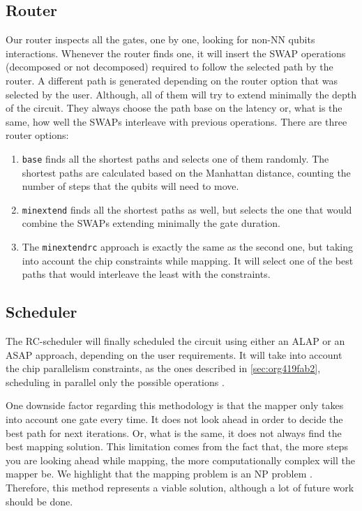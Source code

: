 \subsection{Router}
\label{sec:org38f8894}

Our router inspects all the gates, one by one, looking for non-NN qubits interactions.
Whenever the router finds one, it will insert the SWAP operations (decomposed or not decomposed) required to follow the selected path by the router.
A different path is generated depending on the router option that was selected by the user.
Although, all of them will try to extend minimally the depth of the circuit.
They always choose the path base on the latency or, what is the same, how well the SWAPs interleave with previous operations.
There are three router options:

\begin{enumerate}
\item \texttt{base} finds all the shortest paths and selects one of them randomly. The shortest paths are calculated based on the Manhattan distance, counting the number of steps that the qubits will need to move.
\item \texttt{minextend} finds all the shortest paths as well, but selects the one that would combine the SWAPs extending minimally the gate duration.
\item The \texttt{minextendrc} approach is exactly the same as the second one, but taking into account the chip constraints while mapping. It will select one of the best paths that would interleave the least with the constraints.
\end{enumerate}


\subsection{Scheduler}
\label{sec:org8f6cff7}

The RC-scheduler will finally scheduled the circuit using either an ALAP or an ASAP approach, depending on the user requirements.
It will take into account the chip parallelism constraints, as the ones described in \ref{sec:org419fab2}, scheduling in parallel only the possible operations
.

One downside factor regarding this methodology is that the mapper only takes into account one gate every time.
It does not look ahead in order to decide the best path for next iterations.
Or, what is the same, it does not always find the best mapping solution.
This limitation comes from the fact that, the more steps you are looking ahead while mapping, the more computationally complex will the mapper be.
We highlight that the mapping problem is an NP problem \cite{Siraichi_2018}.
Therefore, this method represents a viable solution, although a lot of future work should be done.

